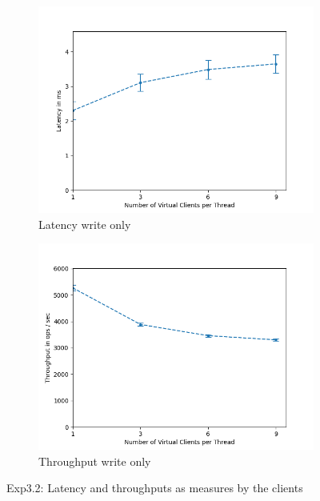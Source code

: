\documentclass[11pt,a4paper]{article}
\begin{document}
\begin{figure}[H]
\centering
\begin{subfigure}{.5\textwidth}
    \centering
    \includegraphics[width=\textwidth]{img/exp5_1/exp5_1__client_latency_sharding_True.png}
    \caption{Latency write only}
    \label{fig:mesh1}
\end{subfigure}%
\begin{subfigure}{.5\textwidth}
      \centering
    \includegraphics[width=\textwidth]{img/exp5_1/exp5_1__client_throughput_sharding_True.png}
    \caption{Throughput write only}
    \label{fig:mesh1}
\end{subfigure}
\caption{Exp3.2: Latency and throughputs as measures by the clients}
\label{fig:test}
\end{figure}
\end{document}
